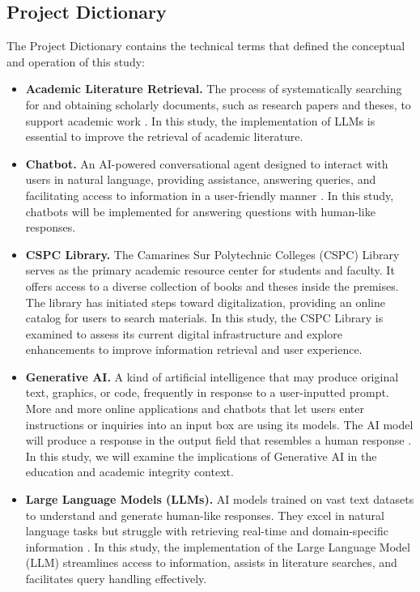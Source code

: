 \begin{refsection}
\newpage
\section{Project Dictionary}

The Project Dictionary contains the technical terms that defined the conceptual and operation of this study:

\begin{itemize}

    \item \textbf{Academic Literature Retrieval.} The process of systematically searching for and obtaining scholarly documents, such as research papers and theses, to support academic work \cite{sallam2023chatgpt}. In this study, the implementation of LLMs is essential to improve the retrieval of academic literature.

    \item \textbf{Chatbot.} An AI-powered conversational agent designed to interact with users in natural language, providing assistance, answering queries, and facilitating access to information in a user-friendly manner \cite{chow2023developing}. In this study, chatbots will be implemented for answering questions with human-like responses.

    \item \textbf{CSPC Library.} The Camarines Sur Polytechnic Colleges (CSPC) Library serves as the primary academic resource center for students and faculty. It offers access to a diverse collection of books and theses inside the premises. The library has initiated steps toward digitalization, providing an online catalog for users to search materials. In this study, the CSPC Library is examined to assess its current digital infrastructure and explore enhancements to improve information retrieval and user experience.

    \item \textbf{Generative AI.} A kind of artificial intelligence that may produce original text, graphics, or code, frequently in response to a user-inputted prompt. More and more online applications and chatbots that let users enter instructions or inquiries into an input box are using its models. The AI model will produce a response in the output field that resembles a human response \cite{bozkurt2024genai}. In this study, we will examine the implications of Generative AI in the education and academic integrity context.

    \item \textbf{Large Language Models (LLMs).} AI models trained on vast text datasets to understand and generate human-like responses. They excel in natural language tasks but struggle with retrieving real-time and domain-specific information \cite{klang2024advancing}. In this study, the implementation of the Large Language Model (LLM) streamlines access to information, assists in literature searches, and facilitates query handling effectively.


\end{itemize}
\end{refsection}
